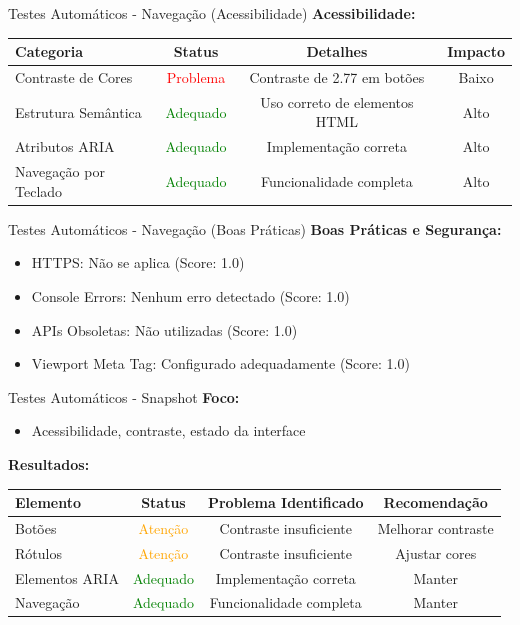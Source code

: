 \documentclass[landscape, 12pt]{beamer}
\begin{document}
\begin{frame}{Testes Automáticos - Navegação (Acessibilidade)}
    \textbf{Acessibilidade:}
    \begin{table}[h]
    \centering
    \scriptsize
    \begin{tabular}{|l|c|c|c|}
    \hline
    \textbf{Categoria} & \textbf{Status} & \textbf{Detalhes} & \textbf{Impacto} \\
    \hline
    Contraste de Cores & \textcolor{red}{Problema} & Contraste de 2.77 em botões & Baixo \\
    Estrutura Semântica & \textcolor{green}{Adequado} & Uso correto de elementos HTML & Alto \\
    Atributos ARIA & \textcolor{green}{Adequado} & Implementação correta & Alto \\
    Navegação por Teclado & \textcolor{green}{Adequado} & Funcionalidade completa & Alto \\
    \hline
    \end{tabular}
    \end{table}
\end{frame}

\begin{frame}{Testes Automáticos - Navegação (Boas Práticas)}
    \textbf{Boas Práticas e Segurança:}
    \begin{itemize}
        \item HTTPS: Não se aplica (Score: 1.0)
        \item Console Errors: Nenhum erro detectado (Score: 1.0)
        \item APIs Obsoletas: Não utilizadas (Score: 1.0)
        \item Viewport Meta Tag: Configurado adequadamente (Score: 1.0)
    \end{itemize}
\end{frame}

\begin{frame}{Testes Automáticos - Snapshot}
    \textbf{Foco:}
    \begin{itemize}
        \item Acessibilidade, contraste, estado da interface
    \end{itemize}
    \vspace{0.3cm}
    \textbf{Resultados:}
    \begin{table}[h]
    \centering
    \scriptsize
    \begin{tabular}{|l|c|c|c|}
    \hline
    \textbf{Elemento} & \textbf{Status} & \textbf{Problema Identificado} & \textbf{Recomendação} \\
    \hline
    Botões & \textcolor{orange}{Atenção} & Contraste insuficiente & Melhorar contraste \\
    Rótulos & \textcolor{orange}{Atenção} & Contraste insuficiente & Ajustar cores \\
    Elementos ARIA & \textcolor{green}{Adequado} & Implementação correta & Manter \\
    Navegação & \textcolor{green}{Adequado} & Funcionalidade completa & Manter \\
    \hline
    \end{tabular}
    \end{table}
\end{frame}
\end{document}
